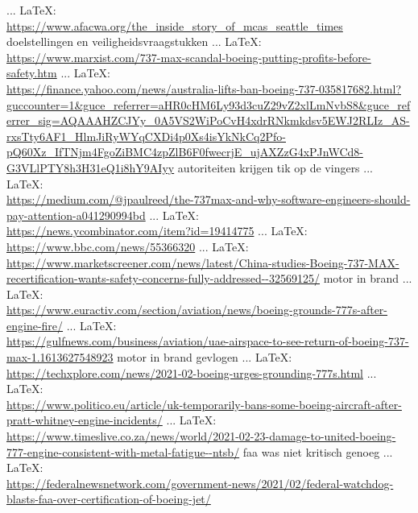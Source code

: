 {{\cite{stodder02102019corruptoversight}
 ... \LaTeX:\\ \url{https://www.afacwa.org/the_inside_story_of_mcas_seattle_times}
\cite{afacwaLostSafeguards}
doelstellingen en veiligheidsvraagstukken
 ... \LaTeX:\\ \url{https://www.marxist.com/737-max-scandal-boeing-putting-profits-before-safety.htm}
\cite{swayne18032019profitssafety}
 ... \LaTeX:\\ \url{https://finance.yahoo.com/news/australia-lifts-ban-boeing-737-035817682.html?guccounter=1&guce_referrer=aHR0cHM6Ly93d3cuZ29vZ2xlLmNvbS8&guce_referrer_sig=AQAAAHZCJYy_0A5VS2WiPoCvH4xdrRNkmkdsv5EWJ2RLIz_AS-rxsTty6AF1_HlmJiRyWYqCXDi4p0Xs4isYkNkCq2Pfo-pQ60Xz_IfTNjm4FgoZiBMC4zpZlB6F0fwecrjE_ujAXZzG4xPJnWCd8-G3VLlPTY8h3H31eQ1i8hY9AIyy}
\cite{freed26022021liftaustraliaban}
autoriteiten krijgen tik op de vingers
 ... \LaTeX:\\ \url{https://medium.com/@jpaulreed/the-737max-and-why-software-engineers-should-pay-attention-a041290994bd}
\cite{reed15032019softwareattention}
 ... \LaTeX:\\ \url{https://news.ycombinator.com/item?id=19414775}
\cite{news17032019softwareexplains}
 ... \LaTeX:\\ \url{https://www.bbc.com/news/55366320}
\cite{legget21122020eu737maxsafe}
 ... \LaTeX:\\ \url{https://www.marketscreener.com/news/latest/China-studies-Boeing-737-MAX-recertification-wants-safety-concerns-fully-addressed--32569125/}
\cite{marketscreener0103221737chinarecertification}
motor in brand
 ... \LaTeX:\\ \url{https://www.euractiv.com/section/aviation/news/boeing-grounds-777s-after-engine-fire/}
\cite{euractiv22022021737firegrounds}
 ... \LaTeX:\\ \url{https://gulfnews.com/business/aviation/uae-airspace-to-see-return-of-boeing-737-max-1.1613627548923}
\cite{benny18022019737returnUAE}
motor in brand gevlogen
 ... \LaTeX:\\ \url{https://techxplore.com/news/2021-02-boeing-urges-grounding-777s.html}
\cite{biersmichel22022021777grounds}
 ... \LaTeX:\\ \url{https://www.politico.eu/article/uk-temporarily-bans-some-boeing-aircraft-after-pratt-whitney-engine-incidents/}
\cite{}
 ... \LaTeX:\\ \url{https://www.timeslive.co.za/news/world/2021-02-23-damage-to-united-boeing-777-engine-consistent-with-metal-fatigue--ntsb/}
\cite{reuters23022021777metalfatigue}
faa was niet kritisch genoeg
 ... \LaTeX:\\ \url{https://federalnewsnetwork.com/government-news/2021/02/federal-watchdog-blasts-faa-over-certification-of-boeing-jet/}
\cite{}

}}
